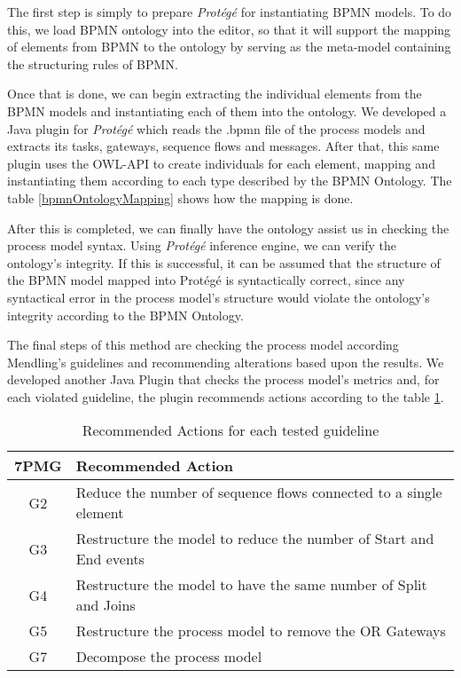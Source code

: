 \documentclass[a4paper,twoside]{article}
\begin{document}
The first step is simply to prepare \textit{Protégé} for instantiating BPMN models. To do this, we load BPMN ontology into the editor, so that it will support the mapping of elements from BPMN to the ontology by serving as the meta-model containing the structuring rules of BPMN.

Once that is done, we can begin extracting the individual elements from the BPMN models and instantiating each of them into the ontology. We developed a Java plugin for \textit{Protégé} which reads the .bpmn file of the process models and extracts its tasks, gateways, sequence flows and messages. After that, this same plugin uses the OWL-API to create individuals for each element, mapping and instantiating them according to each type described by the BPMN Ontology. The table \ref{bpmnOntologyMapping} shows how the mapping is done.

After this is completed, we can finally have the ontology assist us in checking the process model syntax.  Using \textit{Protégé} inference engine, we can verify the ontology's integrity. If this is successful, it can be assumed that the structure of the BPMN model mapped into Protégé is syntactically correct, since any syntactical error in the process model's structure would violate the ontology's integrity according to the BPMN Ontology.

The final steps of this method are checking the process model according Mendling's guidelines and recommending alterations based upon the results. We developed another Java Plugin that checks the process model's metrics and, for each violated guideline, the plugin recommends actions according to the table \ref{RecommendedActions}.

\begin{table}[]
	\centering
	\caption{Recommended Actions for each tested guideline}
	\label{RecommendedActions}
	\begin{tabular}{|c|p{5.5cm}|}
		\hline
		7PMG & Recommended Action \\ \hline
		G2 & Reduce the number of sequence flows connected to a single element \\ \hline
		G3 & Restructure the model to reduce the number of Start and End events \\ \hline
		G4 & Restructure the model to have the same number of Split and Joins \\ \hline
		G5 & Restructure the process model to remove the OR Gateways \\ \hline
		G7 & Decompose the process model \\ \hline
	\end{tabular}
\end{table}
\end{document}
